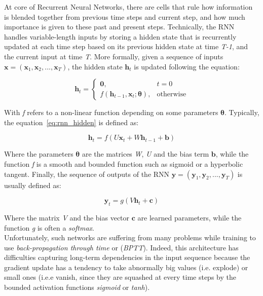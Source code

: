At core of Recurrent Neural Networks, there are cells that rule how information is blended together from previous time steps and current step, and how much importance is given to these past and present steps. Technically, the RNN handles variable-length inputs by storing a hidden state that is recurrently updated at each time step based on its previous hidden state at time \emph{T-1}, and the current input at time \emph{T}. More formally, given a sequence of inputs $\bm{x} = (\bm{x}_1, \bm{x}_2, ..., \bm{x}_T)$, the hidden state $\bm{h}_t$ is updated following the equation:

\begin{equation}\label{eq:rnn_hidden}
\bm{h}_t = 
\begin{cases}
\bm{0}, & t=0 \\
f(\bm{h}_{t-1}, \bm{x}_t; \bm{\theta}), & \mbox{otherwise}
\end{cases}
\end{equation}

With \emph{f} refers to a non-linear function depending on some parameters $\bm{\theta}$. Typically, the equation~\ref{eq:rnn_hidden} is defined as:

\begin{equation}
 \bm{h}_t = f(U\bm{x}_t + W\bm{h}_{t-1} + \bm{b})
\end{equation}

Where the parameters $\bm{\theta}$ are the matrices \emph{W}, \emph{U} and the bias term $\bm{b}$, while the function \emph{f} is a smooth and bounded function such as sigmoid or a hyperbolic tangent. Finally, the sequence of outputs of the RNN $\bm{y} = (\bm{y}_1, \bm{y}_2, ..., \bm{y}_T)$ is usually defined as:

\begin{equation}
\bm{y}_t = g(V\bm{h}_t + \bm{c})
\end{equation}

Where the matrix \emph{V} and the bias vector $\bm{c}$ are learned parameters, while the function \emph{g} is often a \emph{softmax}. \\

Unfortunately, such networks are suffering from many problems while training to use \emph{back-propagation through time} or (\emph{BPTT}). Indeed, this architecture has difficulties capturing long-term dependencies in the input sequence because the gradient update has a tendency to take abnormally big values (i.e. explode) or small ones (i.e.e vanish, since they are squashed at every time steps by the bounded activation functions \emph{sigmoid} or \emph{tanh}). \\

